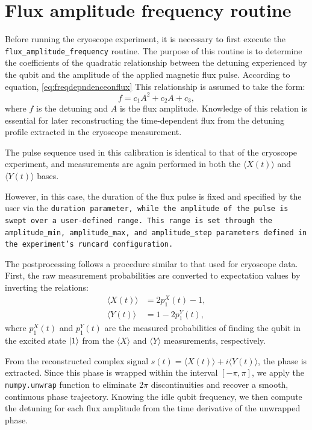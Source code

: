 \chapter{Flux amplitude frequency routine}
\label{app:AppendixE}

Before running the cryoscope experiment, it is necessary to first execute the \texttt{flux\_amplitude\_frequency} routine. 
The purpose of this routine is to determine the coefficients of the quadratic relationship between the detuning experienced by the qubit and the amplitude of the applied magnetic flux pulse. 
According to equation, \ref{eq:freqdepndenceonflux} This relationship is assumed to take the form:
\begin{equation}
f = c_1 A^2 + c_2 A + c_3,
\label{eq:freqdepndenceonflux}
\end{equation}
where $f$ is the detuning and $A$ is the flux amplitude. 
Knowledge of this relation is essential for later reconstructing the time-dependent flux from the detuning profile extracted in the cryoscope measurement.

The pulse sequence used in this calibration is identical to that of the cryoscope experiment, and measurements are again performed in both the $\langle X(t) \rangle$ and $\langle Y(t) \rangle$ bases. 

However, in this case, the duration of the flux pulse is fixed and specified by the user via the \tt{duration} parameter, while the amplitude of the pulse is swept over a user-defined range. 
This range is set through the \tt{amplitude\_min}, \tt{amplitude\_max}, and \tt{amplitude\_step} parameters defined in the experiment's runcard configuration.

The postprocessing follows a procedure similar to that used for cryoscope data. 
First, the raw measurement probabilities are converted to expectation values by inverting the relations:
\begin{align}
\langle X(t) \rangle &= 2p^X_1(t) - 1, \\
\langle Y(t) \rangle &= 1 - 2p^Y_1(t),
\end{align}
where $p^X_1(t)$ and $p^Y_1(t)$ are the measured probabilities of finding the qubit in the excited state $\ket{1}$ from the $\langle X \rangle$ and $\langle Y \rangle$ measurements, respectively.

From the reconstructed complex signal $s(t) = \langle X(t) \rangle + i\langle Y(t) \rangle$, the phase is extracted. 
Since this phase is wrapped within the interval $[-\pi, \pi]$, we apply the \texttt{numpy.unwrap} function to eliminate $2\pi$ discontinuities and recover a smooth, continuous phase trajectory. 
Knowing the idle qubit frequency, we then compute the detuning for each flux amplitude from the time derivative of the unwrapped phase.

